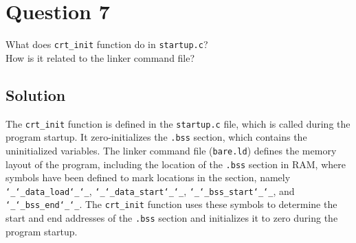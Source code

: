 \section*{Question 7}

What does \texttt{crt\_init} function do in \texttt{startup.c}? \\
How is it related to the linker command file?

\subsection*{Solution}

The \texttt{crt\_init} function is defined in the \texttt{startup.c} file, which is called during the program startup.
It zero-initializes the \texttt{.bss} section, which contains the uninitialized variables.
The linker command file (\texttt{bare.ld}) defines the memory layout of the program, including the location of the \texttt{.bss} section in RAM, where symbols have been defined to mark locations in the section, namely \texttt{\char`_\char`_data\_load\char`_\char`_}, \texttt{\char`_\char`_data\_start\char`_\char`_}, \texttt{\char`_\char`_bss\_start\char`_\char`_}, and \texttt{\char`_\char`_bss\_end\char`_\char`_}.
The \texttt{crt\_init} function uses these symbols to determine the start and end addresses of the \texttt{.bss} section and initializes it to zero during the program startup.

